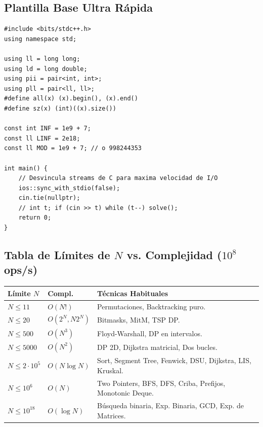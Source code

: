 \documentclass[9pt,twocolumn,a4paper]{extarticle}
\begin{document}
\subsection{Plantilla Base Ultra Rápida}
\begin{lstlisting}
#include <bits/stdc++.h>
using namespace std;

using ll = long long;
using ld = long double;
using pii = pair<int, int>;
using pll = pair<ll, ll>;
#define all(x) (x).begin(), (x).end()
#define sz(x) (int)((x).size())

const int INF = 1e9 + 7;
const ll LINF = 2e18;
const ll MOD = 1e9 + 7; // o 998244353

int main() {
    // Desvincula streams de C para maxima velocidad de I/O
    ios::sync_with_stdio(false);
    cin.tie(nullptr);
    // int t; if (cin >> t) while (t--) solve();
    return 0;
}
\end{lstlisting}

\subsection{Tabla de Límites de $N$ vs. Complejidad ($10^8$ ops/s)}
\begin{tabularx}{\columnwidth}{|l|l|X|}
\hline
\textbf{Límite $N$} & \textbf{Compl.} & \textbf{Técnicas Habituales} \\ \hline
$N \le 11$ & $O(N!)$ & Permutaciones, Backtracking puro. \\ \hline
$N \le 20$ & $O(2^N, N2^N)$ & Bitmasks, MitM, TSP DP. \\ \hline
$N \le 500$ & $O(N^3)$ & Floyd-Warshall, DP en intervalos. \\ \hline
$N \le 5000$ & $O(N^2)$ & DP 2D, Dijkstra matricial, Dos bucles. \\ \hline
$N \le 2\cdot 10^5$ & $O(N \log N)$ & Sort, Segment Tree, Fenwick, DSU, Dijkstra, LIS, Kruskal. \\ \hline
$N \le 10^6$ & $O(N)$ & Two Pointers, BFS, DFS, Criba, Prefijos, Monotonic Deque. \\ \hline
$N \le 10^{18}$ & $O(\log N)$ & Búsqueda binaria, Exp. Binaria, GCD, Exp. de Matrices. \\ \hline
\end{tabularx}
\end{document}
